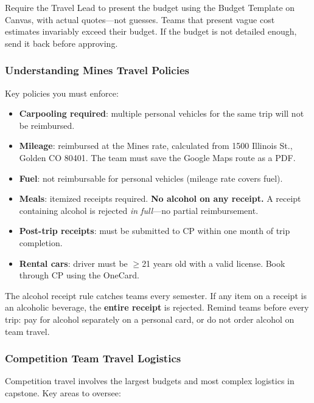 \begin{bestpractice}
Require the Travel Lead to present the budget using the Budget Template on Canvas, with actual quotes---not guesses. Teams that present vague cost estimates invariably exceed their budget. If the budget is not detailed enough, send it back before approving.
\end{bestpractice}

\subsubsection{Understanding Mines Travel Policies}

Key policies you must enforce:

\begin{itemize}[nosep,leftmargin=1.5em]
\item \textbf{Carpooling required}: multiple personal vehicles for the same trip will not be reimbursed.
\item \textbf{Mileage}: reimbursed at the Mines rate, calculated from 1500 Illinois St., Golden CO 80401. The team must save the Google Maps route as a PDF.
\item \textbf{Fuel}: not reimbursable for personal vehicles (mileage rate covers fuel).
\item \textbf{Meals}: itemized receipts required. \textbf{No alcohol on any receipt.} A receipt containing alcohol is rejected \emph{in full}---no partial reimbursement.
\item \textbf{Post-trip receipts}: must be submitted to CP within one month of trip completion.
\item \textbf{Rental cars}: driver must be $\geq$21 years old with a valid license. Book through CP using the OneCard.
\end{itemize}

\begin{warnbox}
The alcohol receipt rule catches teams every semester. If any item on a receipt is an alcoholic beverage, the \textbf{entire receipt} is rejected. Remind teams before every trip: pay for alcohol separately on a personal card, or do not order alcohol on team travel.
\end{warnbox}

\subsubsection{Competition Team Travel Logistics}

Competition travel involves the largest budgets and most complex logistics in capstone. Key areas to oversee:

